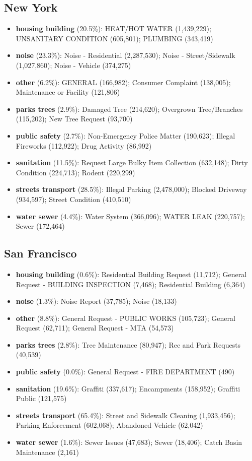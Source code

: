 \subsection*{New York}
\begin{itemize}
\item \textbf{housing building} (20.5\%): HEAT/HOT WATER (1,439,229); UNSANITARY CONDITION (605,801); PLUMBING (343,419)
\item \textbf{noise} (23.3\%): Noise - Residential (2,287,530); Noise - Street/Sidewalk (1,027,860); Noise - Vehicle (374,275)
\item \textbf{other} (6.2\%): GENERAL (166,982); Consumer Complaint (138,005); Maintenance or Facility (121,806)
\item \textbf{parks trees} (2.9\%): Damaged Tree (214,620); Overgrown Tree/Branches (115,202); New Tree Request (93,700)
\item \textbf{public safety} (2.7\%): Non-Emergency Police Matter (190,623); Illegal Fireworks (112,922); Drug Activity (86,992)
\item \textbf{sanitation} (11.5\%): Request Large Bulky Item Collection (632,148); Dirty Condition (224,713); Rodent (220,299)
\item \textbf{streets transport} (28.5\%): Illegal Parking (2,478,000); Blocked Driveway (934,597); Street Condition (410,510)
\item \textbf{water sewer} (4.4\%): Water System (366,096); WATER LEAK (220,757); Sewer (172,464)
\end{itemize}
\subsection*{San Francisco}
\begin{itemize}
\item \textbf{housing building} (0.6\%): Residential Building Request (11,712); General Request - BUILDING INSPECTION (7,468); Residential Building (6,364)
\item \textbf{noise} (1.3\%): Noise Report (37,785); Noise (18,133)
\item \textbf{other} (8.8\%): General Request - PUBLIC WORKS (105,723); General Request (62,711); General Request - MTA (54,573)
\item \textbf{parks trees} (2.8\%): Tree Maintenance (80,947); Rec and Park Requests (40,539)
\item \textbf{public safety} (0.0\%): General Request - FIRE DEPARTMENT (490)
\item \textbf{sanitation} (19.6\%): Graffiti (337,617); Encampments (158,952); Graffiti Public (121,575)
\item \textbf{streets transport} (65.4\%): Street and Sidewalk Cleaning (1,933,456); Parking Enforcement (602,068); Abandoned Vehicle (62,042)
\item \textbf{water sewer} (1.6\%): Sewer Issues (47,683); Sewer (18,406); Catch Basin Maintenance (2,161)
\end{itemize}
